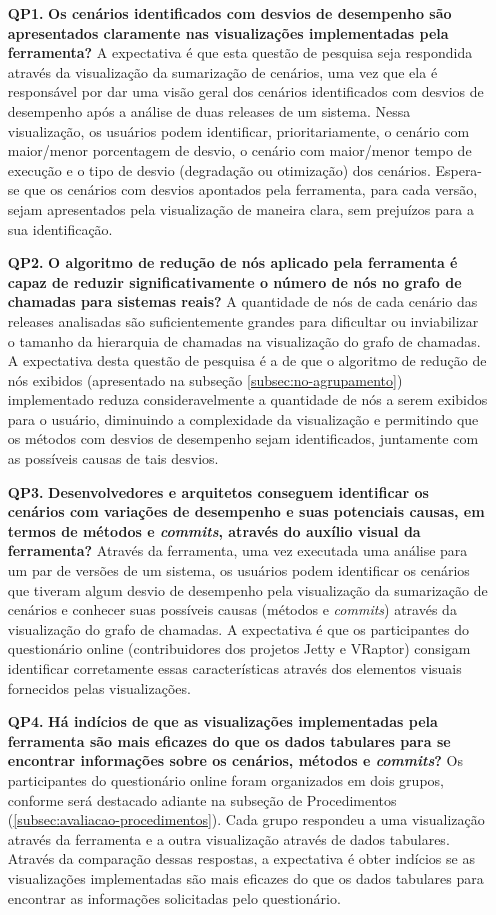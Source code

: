 \begin{itemize}
  \item[\textbf{QP1.}] \textbf{Os cenários identificados com desvios de desempenho são apresentados claramente nas visualizações implementadas pela ferramenta?} A expectativa é que esta questão de pesquisa seja respondida através da visualização da sumarização de cenários, uma vez que ela é responsável por dar uma visão geral dos cenários identificados com desvios de desempenho após a análise de duas releases de um sistema. Nessa visualização, os usuários podem identificar, prioritariamente, o cenário com maior/menor porcentagem de desvio, o cenário com maior/menor tempo de execução e o tipo de desvio (degradação ou otimização) dos cenários. Espera-se que os cenários com desvios apontados pela ferramenta, para cada versão, sejam apresentados pela visualização de maneira clara, sem prejuízos para a sua identificação.
  \item[\textbf{QP2.}] \textbf{O algoritmo de redução de nós aplicado pela ferramenta é capaz de reduzir significativamente o número de nós no grafo de chamadas para sistemas reais?} A quantidade de nós de cada cenário das releases analisadas são suficientemente grandes para dificultar ou inviabilizar o tamanho da hierarquia de chamadas na visualização do grafo de chamadas. A expectativa desta questão de pesquisa é a de que o algoritmo de redução de nós exibidos (apresentado na subseção \ref{subsec:no-agrupamento}) implementado reduza consideravelmente a quantidade de nós a serem exibidos para o usuário, diminuindo a complexidade da visualização e permitindo que os métodos com desvios de desempenho sejam identificados, juntamente com as possíveis causas de tais desvios. 
  \item[\textbf{QP3.}] \textbf{Desenvolvedores e arquitetos conseguem identificar os cenários com variações de desempenho e suas potenciais causas, em termos de métodos e \textit{commits}, através do auxílio visual da ferramenta?} Através da ferramenta, uma vez executada uma análise para um par de versões de um sistema, os usuários podem identificar os cenários que tiveram algum desvio de desempenho pela visualização da sumarização de cenários e conhecer suas possíveis causas (métodos e \textit{commits}) através da visualização do grafo de chamadas. A expectativa é que os participantes do questionário online (contribuidores dos projetos Jetty e VRaptor) consigam identificar corretamente essas características através dos elementos visuais fornecidos pelas visualizações.
  \item[\textbf{QP4.}] \textbf{Há indícios de que as visualizações implementadas pela ferramenta são mais eficazes do que os dados tabulares para se encontrar informações sobre os cenários, métodos e \textit{commits}?} Os participantes do questionário online foram organizados em dois grupos, conforme será destacado adiante na subseção de Procedimentos (\ref{subsec:avaliacao-procedimentos}). Cada grupo respondeu a uma visualização através da ferramenta e a outra visualização através de dados tabulares. Através da comparação dessas respostas, a expectativa é obter indícios se as visualizações implementadas são mais eficazes do que os dados tabulares para encontrar as informações solicitadas pelo questionário.

\end{itemize}
